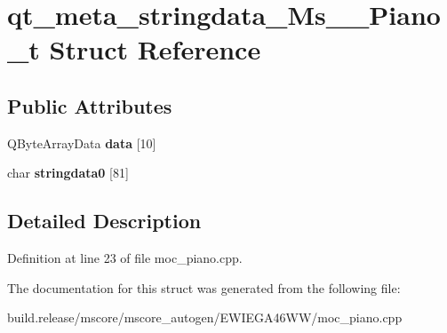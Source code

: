 \hypertarget{structqt__meta__stringdata___ms_____piano__t}{}\section{qt\+\_\+meta\+\_\+stringdata\+\_\+\+Ms\+\_\+\+\_\+\+Piano\+\_\+t Struct Reference}
\label{structqt__meta__stringdata___ms_____piano__t}
\subsection*{Public Attributes}
\begin{DoxyCompactItemize}
\item 
\mbox{\label{structqt__meta__stringdata___ms_____piano__t_adbe65cebfcdbfbb41f8b69b1d24480d1}} 
Q\+Byte\+Array\+Data {\bfseries data} \mbox{[}10\mbox{]}
\item 
\mbox{\label{structqt__meta__stringdata___ms_____piano__t_afbbc2110bd77507278a1ac3892f6c95d}} 
char {\bfseries stringdata0} \mbox{[}81\mbox{]}
\end{DoxyCompactItemize}


\subsection{Detailed Description}


Definition at line 23 of file moc\+\_\+piano.\+cpp.



The documentation for this struct was generated from the following file\+:\begin{DoxyCompactItemize}
\item 
build.\+release/mscore/mscore\+\_\+autogen/\+E\+W\+I\+E\+G\+A46\+W\+W/moc\+\_\+piano.\+cpp\end{DoxyCompactItemize}
